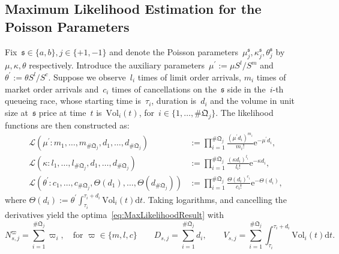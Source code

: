 \documentclass{amsart}[11pt]
\numberwithin{equation}{section}
\theoremstyle{definition}
\newcommand{\D}{\mathrm{d}}
\newcommand{\E}{\mathrm{e}}
\newcommand{\ssf}{\mathfrak{s}}
\newcommand{\Qf}{\mathfrak{Q}}
\begin{document}
\begin{appendix}
\section{Maximum Likelihood Estimation for the Poisson Parameters}\label{App:MLE}
Fix~$\ssf\in\{a, b\}, j\in\{+1, -1\}$ and 
denote the Poisson parameters~$\mu_j^\ssf, \kappa_j^\ssf, \theta_j^\ssf$
by~$\mu, \kappa, \theta$ respectively.
Introduce the auxiliary parameters~$\mu^\prime := \mu S^l/S^m$
and~$\theta^\prime := \theta S^l/ S^c$.
Suppose we observe~$l_i$ times of limit order arrivals, 
$m_i$ times of market order arrivals and~$c_i$ times of cancellations on the~$\ssf$ side in the~$i$-th queueing race,
whose starting time is~$\tau_i$,
duration is~$d_i$
and
the volume in unit size at~$\ssf$ price at time~$t$ is~$\text{Vol}_i(t)$,
for~$i \in \{1, \dots, \# \Qf_j\}$.
The likelihood functions are then constructed as:
\begin{align*}
\mathcal{L}\left(\mu^\prime: m_1, \dots, m_{\# \Qf_j}, d_1, \dots, d_{\# \Qf_j}\right)
&:=\prod_{i =1}^{\# \Qf_j}\frac{{(\mu^\prime d_i)}^{m_i}}{m_i !}\E^{-\mu^\prime d_i},\\
\mathcal{L}\left(\kappa: l_1, \dots, l_{\# \Qf_j}, d_1, \dots, d_{\# \Qf_j}\right)
&:=\prod_{i =1}^{\# \Qf_j}\frac{{(\kappa d_i)}^{l_i}}{l_i !}\E^{-\kappa d_i},\\
\mathcal{L}\left(\theta^\prime: c_1, \dots, c_{\# \Qf_j}, \Theta(d_1), \dots, \Theta(d_{\# \Qf_j})\right)
&:=\prod_{i =1}^{\# \Qf_j}\frac{{\Theta(d_i)}^{c_i}}{c_i !}\E^{-\Theta(d_i)},
\end{align*}
where $\Theta(d_i):=\theta^\prime \int_{\tau_i}^{\tau_i+d_i}\text{Vol}_i(t)\D t$.
Taking logarithms, and cancelling the derivatives yield the optima~\eqref{eq:MaxLikelihoodResult}
with
$$
N_{s,j}^{\varpi} = \sum_{i=1}^{\# \Qf_j}\varpi_i,\quad\text{for }\varpi\in \{m,l,c\}\qquad
D_{s,j} = \sum_{i=1}^{\# \Qf_j}d_i,\qquad
V_{s,j} = \sum_{i=1}^{\# \Qf_j}\int_{\tau_i}^{\tau_i+d_i}\text{Vol}_i(t)\D t.
$$
\end{appendix}
\end{document}
